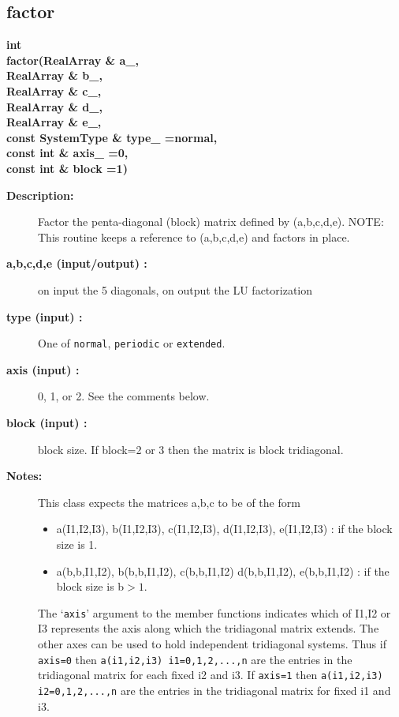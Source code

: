\subsection{factor}
 
\begin{flushleft} \textbf{%
int  \\ 
\settowidth{\TridiagonalSolverIncludeArgIndent}{factor(}%
factor(RealArray \& a\_, \\ 
\hspace{\TridiagonalSolverIncludeArgIndent}RealArray \& b\_, \\ 
\hspace{\TridiagonalSolverIncludeArgIndent}RealArray \& c\_, \\ 
\hspace{\TridiagonalSolverIncludeArgIndent}RealArray \& d\_, \\ 
\hspace{\TridiagonalSolverIncludeArgIndent}RealArray \& e\_, \\ 
\hspace{\TridiagonalSolverIncludeArgIndent}const SystemType \& type\_  =normal,\\ 
\hspace{\TridiagonalSolverIncludeArgIndent}const int \& axis\_  =0,\\ 
\hspace{\TridiagonalSolverIncludeArgIndent}const int \& block  =1)
}\end{flushleft}
\begin{description}
\item[{\bf Description:}] 
   Factor the penta-diagonal (block) matrix defined by (a,b,c,d,e).
   NOTE: This routine keeps a reference to (a,b,c,d,e) and factors in place. 
\item[{\bf a,b,c,d,e (input/output) :}]  on input the 5 diagonals, on output the LU factorization
\item[{\bf type (input) :}]  One of {\tt normal}, {\tt periodic} or {\tt extended}.
\item[{\bf axis (input) :}]  0, 1, or 2. See the comments below.
\item[{\bf block (input) :}]  block size. If block=2 or 3 then the matrix is block tridiagonal.
\item[{\bf Notes:}] 
 This class expects the matrices a,b,c to be of the form
 \begin{itemize}
  \item a(I1,I2,I3), b(I1,I2,I3), c(I1,I2,I3), d(I1,I2,I3), e(I1,I2,I3) : if the block size is 1.
  \item a(b,b,I1,I2), b(b,b,I1,I2), c(b,b,I1,I2) d(b,b,I1,I2), e(b,b,I1,I2) : if the block size is b$>1$.
 \end{itemize}
  The `{\tt axis}' argument to the member functions indicates which of I1,I2 or I3
  represents the axis along which the tridiagonal matrix extends. The other axes
  can be used to hold independent tridiagonal systems. Thus if {\tt axis=0} then
  {\tt a(i1,i2,i3) i1=0,1,2,...,n} are the entries in the tridiagonal matrix for
  each fixed i2 and i3. If {\tt axis=1} then {\tt a(i1,i2,i3) i2=0,1,2,...,n} 
 are the entries in the tridiagonal matrix for fixed i1 and i3.
\end{description}
